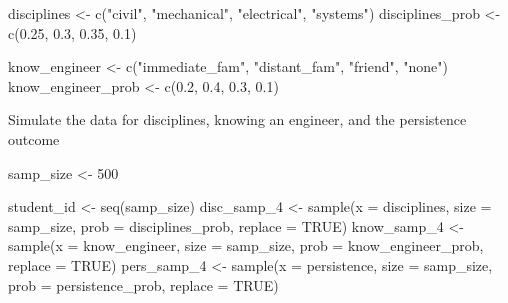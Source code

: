 \documentclass[
]{book}
\newenvironment{Shaded}{\begin{snugshade}}{\end{snugshade}}
\newcommand{\AttributeTok}[1]{\textcolor[rgb]{0.77,0.63,0.00}{#1}}
\newcommand{\ConstantTok}[1]{\textcolor[rgb]{0.00,0.00,0.00}{#1}}
\newcommand{\DecValTok}[1]{\textcolor[rgb]{0.00,0.00,0.81}{#1}}
\newcommand{\FloatTok}[1]{\textcolor[rgb]{0.00,0.00,0.81}{#1}}
\newcommand{\FunctionTok}[1]{\textcolor[rgb]{0.00,0.00,0.00}{#1}}
\newcommand{\NormalTok}[1]{#1}
\newcommand{\OtherTok}[1]{\textcolor[rgb]{0.56,0.35,0.01}{#1}}
\newcommand{\StringTok}[1]{\textcolor[rgb]{0.31,0.60,0.02}{#1}}
\begin{document}
\begin{Shaded}
\begin{Highlighting}[]
\NormalTok{disciplines }\OtherTok{\textless{}{-}} \FunctionTok{c}\NormalTok{(}\StringTok{"civil"}\NormalTok{, }\StringTok{"mechanical"}\NormalTok{, }\StringTok{"electrical"}\NormalTok{, }\StringTok{"systems"}\NormalTok{)}
\NormalTok{disciplines\_prob }\OtherTok{\textless{}{-}} \FunctionTok{c}\NormalTok{(}\FloatTok{0.25}\NormalTok{, }\FloatTok{0.3}\NormalTok{, }\FloatTok{0.35}\NormalTok{, }\FloatTok{0.1}\NormalTok{)}

\NormalTok{know\_engineer }\OtherTok{\textless{}{-}} \FunctionTok{c}\NormalTok{(}\StringTok{"immediate\_fam"}\NormalTok{, }\StringTok{"distant\_fam"}\NormalTok{, }\StringTok{"friend"}\NormalTok{, }\StringTok{"none"}\NormalTok{)}
\NormalTok{know\_engineer\_prob }\OtherTok{\textless{}{-}} \FunctionTok{c}\NormalTok{(}\FloatTok{0.2}\NormalTok{, }\FloatTok{0.4}\NormalTok{, }\FloatTok{0.3}\NormalTok{, }\FloatTok{0.1}\NormalTok{)}
\end{Highlighting}
\end{Shaded}

Simulate the data for disciplines, knowing an engineer, and the persistence outcome

\begin{Shaded}
\begin{Highlighting}[]
\NormalTok{samp\_size }\OtherTok{\textless{}{-}} \DecValTok{500}

\NormalTok{student\_id }\OtherTok{\textless{}{-}} \FunctionTok{seq}\NormalTok{(samp\_size)}
\NormalTok{disc\_samp\_4 }\OtherTok{\textless{}{-}} \FunctionTok{sample}\NormalTok{(}\AttributeTok{x =}\NormalTok{ disciplines, }\AttributeTok{size =}\NormalTok{ samp\_size, }\AttributeTok{prob =}\NormalTok{ disciplines\_prob, }\AttributeTok{replace =} \ConstantTok{TRUE}\NormalTok{)}
\NormalTok{know\_samp\_4 }\OtherTok{\textless{}{-}} \FunctionTok{sample}\NormalTok{(}\AttributeTok{x =}\NormalTok{ know\_engineer, }\AttributeTok{size =}\NormalTok{ samp\_size, }\AttributeTok{prob =}\NormalTok{ know\_engineer\_prob, }\AttributeTok{replace =} \ConstantTok{TRUE}\NormalTok{)}
\NormalTok{pers\_samp\_4 }\OtherTok{\textless{}{-}} \FunctionTok{sample}\NormalTok{(}\AttributeTok{x =}\NormalTok{ persistence, }\AttributeTok{size =}\NormalTok{ samp\_size, }\AttributeTok{prob =}\NormalTok{ persistence\_prob, }\AttributeTok{replace =} \ConstantTok{TRUE}\NormalTok{)}
\end{Highlighting}
\end{Shaded}
\end{document}
